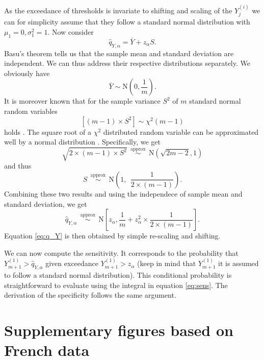 \documentclass{article}
\begin{document}
As the exceedance of thresholds is invariate to shifting and scaling of the $Y^{(i)}_j$ we can for simplicity assume that they follow a standard normal distribution with $\mu_1 = 0, \sigma^2_1 = 1$. Now consider
$$
\hat{q}_{Y, \alpha} = \bar{Y} + z_\alpha S.
$$
Basu's theorem tells us that the sample mean and standard deviation are independent. We can thus  address their respective distributions separately. We obviously have
$$
\bar{Y} \sim \text{N}\left(0, \frac{1}{m}\right).
$$
It is moreover known that for the sample variance $S^2$ of $m$ standard normal random variables
$$
[(m - 1) \times S^2] \sim \chi^2(m - 1)
$$
holds \citep{HELM2008}. The square root of a $\chi^2$ distributed random variable can be approximated well by a normal distribution \citep[p426]{Johnson1994}. Specifically, we get
$$
\sqrt{2 \times (m - 1) \times S^2} \ \  \stackrel{\text{approx}}{\sim} \ \ \text{N}(\sqrt{2m - 2}, 1)
$$
and thus
$$
S \ \  \stackrel{\text{approx}}{\sim} \ \ \text{N}\left(1, \ \ \frac{1}{2\times(m - 1)}\right).
$$
Combining these two results and using the independece of sample mean and standard deviation, we get
$$
\hat{q}_{Y, \alpha} \ \  \stackrel{\text{approx}}{\sim} \ \ \text{N}\left[z_\alpha, \frac{1}{m} + z_\alpha^2 \times \frac{1}{2 \times (m - 1)} \right].
$$
Equation \eqref{eq:q_Y} is then obtained by simple re-scaling and shifting.

We can now compute the sensitivity. It corresponds to the probability that $Y^{(1)}_{m + 1} > \hat{q}_{Y, \alpha}$ given exceedance $Y^{(1)}_{m + 1} > z_\alpha$ (keep in mind that $Y^{(1)}_{m + 1}$ it is assumed to follow a standard normal distribution). This conditional probability is straightforward to evaluate using the integral in equation \eqref{eq:sens}. The derivation of the specificity follows the same argument.

\newpage

\section{Supplementary figures based on French data}
\end{document}

